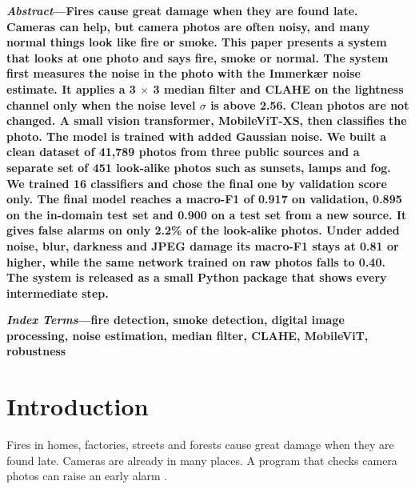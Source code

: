 \documentclass[10pt,twocolumn,letterpaper]{article}
\begin{document}

\noindent\textbf{\textit{Abstract}---Fires cause great damage when they are found late. Cameras can help, but camera photos are often noisy, and many normal things look like fire or smoke. This paper presents a system that looks at one photo and says fire, smoke or normal. The system first measures the noise in the photo with the Immerkær noise estimate. It applies a 3 $\times$ 3 median filter and CLAHE on the lightness channel only when the noise level $\sigma$ is above 2.56. Clean photos are not changed. A small vision transformer, MobileViT-XS, then classifies the photo. The model is trained with added Gaussian noise. We built a clean dataset of 41,789 photos from three public sources and a separate set of 451 look-alike photos such as sunsets, lamps and fog. We trained 16 classifiers and chose the final one by validation score only. The final model reaches a macro-F1 of 0.917 on validation, 0.895 on the in-domain test set and 0.900 on a test set from a new source. It gives false alarms on only 2.2\% of the look-alike photos. Under added noise, blur, darkness and JPEG damage its macro-F1 stays at 0.81 or higher, while the same network trained on raw photos falls to 0.40. The system is released as a small Python package that shows every intermediate step.}

\vspace{4pt}
\noindent\textbf{\textit{Index Terms}---fire detection, smoke detection, digital image processing, noise estimation, median filter, CLAHE, MobileViT, robustness}


\section{Introduction}
Fires in homes, factories, streets and forests cause great damage when they are found late. Cameras are already in many places. A program that checks camera photos can raise an early alarm \cite{muhammad}.
\end{document}
